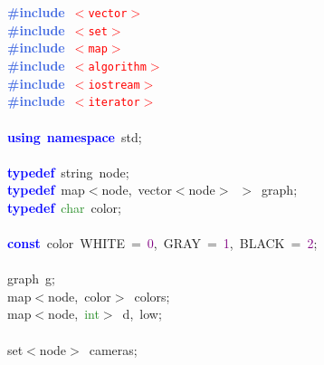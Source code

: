 \documentclass[10pt,a4paper,twoside]{article}
\begin{document}
{{{{{{{{\noindent
\mbox{}\textbf{\textcolor{RoyalBlue}{\#include}}\ \texttt{\textcolor{Red}{$<$vector$>$}} \\
\mbox{}\textbf{\textcolor{RoyalBlue}{\#include}}\ \texttt{\textcolor{Red}{$<$set$>$}} \\
\mbox{}\textbf{\textcolor{RoyalBlue}{\#include}}\ \texttt{\textcolor{Red}{$<$map$>$}} \\
\mbox{}\textbf{\textcolor{RoyalBlue}{\#include}}\ \texttt{\textcolor{Red}{$<$algorithm$>$}} \\
\mbox{}\textbf{\textcolor{RoyalBlue}{\#include}}\ \texttt{\textcolor{Red}{$<$iostream$>$}} \\
\mbox{}\textbf{\textcolor{RoyalBlue}{\#include}}\ \texttt{\textcolor{Red}{$<$iterator$>$}} \\
\mbox{} \\
\mbox{}\textbf{\textcolor{Blue}{using}}\ \textbf{\textcolor{Blue}{namespace}}\ std\textcolor{BrickRed}{;} \\
\mbox{} \\
\mbox{}\textbf{\textcolor{Blue}{typedef}}\ string\ node\textcolor{BrickRed}{;} \\
\mbox{}\textbf{\textcolor{Blue}{typedef}}\ map\textcolor{BrickRed}{$<$}node\textcolor{BrickRed}{,}\ vector\textcolor{BrickRed}{$<$}node\textcolor{BrickRed}{$>$}\ \textcolor{BrickRed}{$>$}\ graph\textcolor{BrickRed}{;} \\
\mbox{}\textbf{\textcolor{Blue}{typedef}}\ \textcolor{ForestGreen}{char}\ color\textcolor{BrickRed}{;} \\
\mbox{} \\
\mbox{}\textbf{\textcolor{Blue}{const}}\ color\ WHITE\ \textcolor{BrickRed}{=}\ \textcolor{Purple}{0}\textcolor{BrickRed}{,}\ GRAY\ \textcolor{BrickRed}{=}\ \textcolor{Purple}{1}\textcolor{BrickRed}{,}\ BLACK\ \textcolor{BrickRed}{=}\ \textcolor{Purple}{2}\textcolor{BrickRed}{;} \\
\mbox{} \\
\mbox{}graph\ g\textcolor{BrickRed}{;} \\
\mbox{}map\textcolor{BrickRed}{$<$}node\textcolor{BrickRed}{,}\ color\textcolor{BrickRed}{$>$}\ colors\textcolor{BrickRed}{;} \\
\mbox{}map\textcolor{BrickRed}{$<$}node\textcolor{BrickRed}{,}\ \textcolor{ForestGreen}{int}\textcolor{BrickRed}{$>$}\ d\textcolor{BrickRed}{,}\ low\textcolor{BrickRed}{;} \\
\mbox{} \\
\mbox{}set\textcolor{BrickRed}{$<$}node\textcolor{BrickRed}{$>$}\ cameras\textcolor{BrickRed}{;} \\
}}}}}}}}
\end{document}
